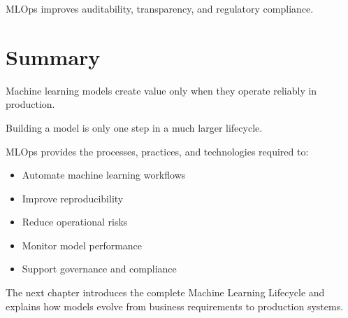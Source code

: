 MLOps improves auditability, transparency, and regulatory compliance.

\section{Summary}

Machine learning models create value only when they operate reliably in production.

Building a model is only one step in a much larger lifecycle.

MLOps provides the processes, practices, and technologies required to:

\begin{itemize}
    \item Automate machine learning workflows
    \item Improve reproducibility
    \item Reduce operational risks
    \item Monitor model performance
    \item Support governance and compliance
\end{itemize}

The next chapter introduces the complete Machine Learning Lifecycle and explains how models evolve from business requirements to production systems.